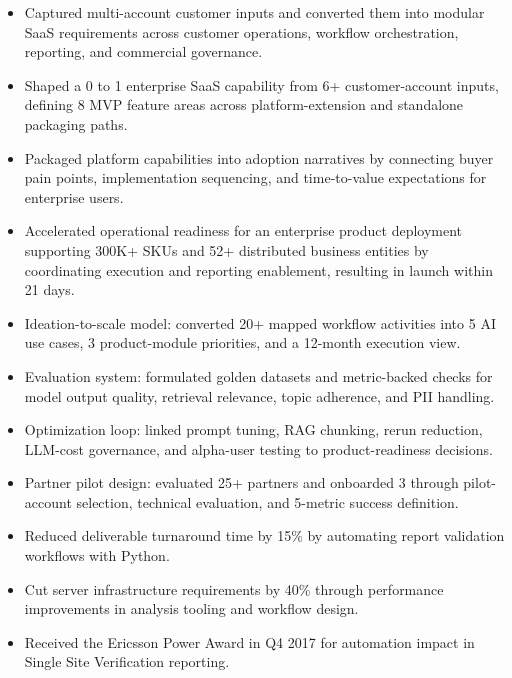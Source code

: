 \documentclass[10pt]{article}
\begin{document}
\begin{itemize}
  \item Captured multi-account customer inputs and converted them into modular SaaS requirements across customer operations, workflow orchestration, reporting, and commercial governance.
  \item Shaped a 0 to 1 enterprise SaaS capability from 6+ customer-account inputs, defining 8 MVP feature areas across platform-extension and standalone packaging paths.
  \item Packaged platform capabilities into adoption narratives by connecting buyer pain points, implementation sequencing, and time-to-value expectations for enterprise users.
  \item Accelerated operational readiness for an enterprise product deployment supporting 300K+ SKUs and 52+ distributed business entities by coordinating execution and reporting enablement, resulting in launch within 21 days.
\end{itemize}

\begin{itemize}
  \item Ideation-to-scale model: converted 20+ mapped workflow activities into 5 AI use cases, 3 product-module priorities, and a 12-month execution view.
  \item Evaluation system: formulated golden datasets and metric-backed checks for model output quality, retrieval relevance, topic adherence, and PII handling.
  \item Optimization loop: linked prompt tuning, RAG chunking, rerun reduction, LLM-cost governance, and alpha-user testing to product-readiness decisions.
  \item Partner pilot design: evaluated 25+ partners and onboarded 3 through pilot-account selection, technical evaluation, and 5-metric success definition.
\end{itemize}

\begin{itemize}
  \item Reduced deliverable turnaround time by 15\% by automating report validation workflows with Python.
  \item Cut server infrastructure requirements by 40\% through performance improvements in analysis tooling and workflow design.
  \item Received the Ericsson Power Award in Q4 2017 for automation impact in Single Site Verification reporting.
\end{itemize}
\end{document}
